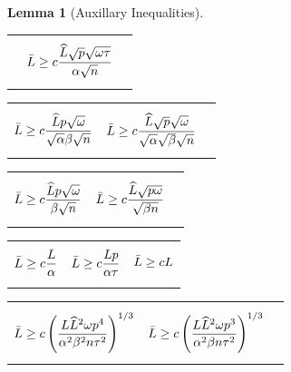 \documentclass{article} %
\theoremstyle{plain}
\newtheorem{lemma}[theorem]{Lemma}
\theoremstyle{definition}
\theoremstyle{remark}
\begin{document}
\begin{lemma}[Auxillary Inequalities]
\begin{tabularx}{1.1\linewidth}{XXX}
\begin{equation}
    \end{equation}
    &
    \begin{equation}
      \bar{L} \geq c\frac{\widehat{L} \sqrt{p} \sqrt{\omega \tau}}{\alpha \sqrt{n}} \label{eq:lipt:hat_p}
    \end{equation}
  \end{tabularx}
  \begin{tabularx}{1.1\linewidth}{XXX}
    \begin{equation}
      \bar{L} \geq c\frac{\widehat{L} p \sqrt{\omega}}{\sqrt{\alpha} \beta \sqrt{n}} \label{eq:lipt:hat_alpha_2}
    \end{equation}
    &
    \begin{equation}
      \bar{L} \geq c\frac{\widehat{L} \sqrt{p} \sqrt{\omega}}{\sqrt{\alpha} \sqrt{\beta} \sqrt{n}} \label{eq:lipt:hat_alpha_1}
    \end{equation}
    &
  \end{tabularx}
  \begin{tabularx}{1.1\linewidth}{XXX}
    \begin{equation}
      \bar{L} \geq c\frac{\widehat{L} p \sqrt{\omega}}{\beta \sqrt{n}} \label{eq:lipt:hat_no_alpha_2}
    \end{equation}
    &
    \begin{equation}
      \bar{L} \geq c\frac{\widehat{L} \sqrt{p \omega}}{\sqrt{\beta n}} \label{eq:lipt:hat_no_alpha_1}
    \end{equation}
    &
  \end{tabularx}
  \begin{tabularx}{1.1\linewidth}{XXX}
    \begin{equation}
      \bar{L} \geq c\frac{L}{\alpha} \label{eq:lipt:plain}
    \end{equation}
    &
    \begin{equation}
      \bar{L} \geq c\frac{L p}{\alpha \tau} \label{eq:lipt:plain_p_alpha}
    \end{equation}
    &
    \begin{equation}
      \bar{L} \geq c L \label{eq:lipt:plain_no_alpha}
    \end{equation}
  \end{tabularx}
  \begin{tabularx}{1.1\linewidth}{XXX}
    \begin{equation}
      \bar{L} \geq c \left(\frac{L \widehat{L}^2 \omega p^4}{\alpha^2 \beta^2 n \tau^2}\right)^{1/3} \label{eq:lipt:double_lipt_2}
    \end{equation}
    &
    \begin{equation}
      \bar{L} \geq c \left(\frac{L \widehat{L}^2 \omega p^3}{\alpha^2 \beta n \tau^2}\right)^{1/3} \label{eq:lipt:double_lipt_1}
    \end{equation}
    &
  \end{tabularx}
\end{lemma}
\end{document}
